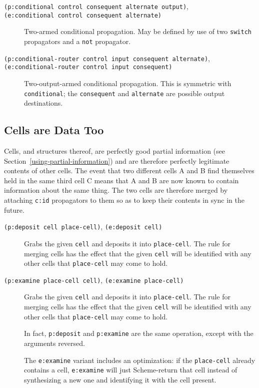 \documentclass[12pt,letterpaper,english]{article}
\begin{document}
\begin{description}
\item[{\texttt{(p:conditional control consequent alternate output)},}]
\item[{\texttt{(e:conditional control consequent alternate)}}] \leavevmode 
Two-armed conditional propagation.  May be defined by use of two
\texttt{switch} propagators and a \texttt{not} propagator.

\item[{\texttt{(p:conditional-router control input consequent alternate)},}]
\item[{\texttt{(e:conditional-router control input consequent)}}] \leavevmode 
Two-output-armed conditional propagation.  This is symmetric with
\texttt{conditional}; the \texttt{consequent} and \texttt{alternate} are possible
output destinations.

\end{description}



\hypertarget{cells-are-data-too}{}
\subsection{Cells are Data Too}
\label{cells-are-data-too}

Cells, and structures thereof, are perfectly good partial information
(see Section~\ref{using-partial-information})
and are therefore perfectly legitimate contents of other
cells.  The event that two different cells A and B find themselves
held in the same third cell C means that A and B are now known to
contain information about the same thing.  The two cells are therefore
merged by attaching \texttt{c:id} propagators to them so as to keep their
contents in sync in the future.
\begin{description}
\item[{\texttt{(p:deposit cell place-cell)}, \texttt{(e:deposit cell)}}] \leavevmode 
Grabs the given \texttt{cell} and deposits it into \texttt{place-cell}.  The
rule for merging cells has the effect that the given \texttt{cell} will
be identified with any other cells that \texttt{place-cell} may come to
hold.

\item[{\texttt{(p:examine place-cell cell)}, \texttt{(e:examine place-cell)}}] \leavevmode 
Grabs the given \texttt{cell} and deposits it into \texttt{place-cell}.  The
rule for merging cells has the effect that the given \texttt{cell} will
be identified with any other cells that \texttt{place-cell} may come to
hold.

In fact, \texttt{p:deposit} and \texttt{p:examine} are the same operation,
except with the arguments reversed.

The \texttt{e:examine} variant includes an optimization: if the
\texttt{place-cell} already contains a cell, \texttt{e:examine} will just
Scheme-return that cell instead of synthesizing a new one and
identifying it with the cell present.

\end{description}
\end{document}
